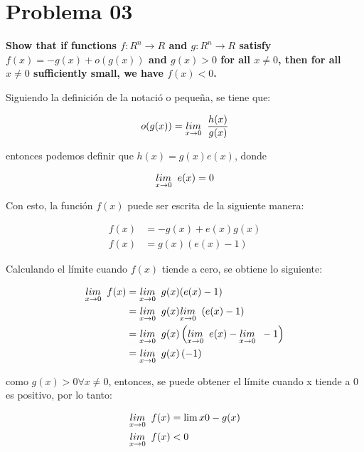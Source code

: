 \section*{Problema 03}

\textbf{Show that if functions $f : R^n \rightarrow R$ and $g : R^n \rightarrow R$ satisfy $f (x) = -g(x) + o(g(x))$ and $g(x) > 0$ for all $x \neq 0$, then for all $x \neq 0$ sufficiently small, we have $f (x) < 0$.}

Siguiendo la definición de la notació o pequeña, se tiene que:

\begin{equation*}
    o(g(x)) = \underset{x \rightarrow 0}{lim} \;\; \frac{h(x)}{g(x)}
\end{equation*}

entonces podemos definir que $h(x)=g(x)e(x)$, donde

\begin{equation*}
    \underset{x \rightarrow 0}{lim} \;\; e(x) =0
\end{equation*}

Con esto, la función $f(x)$ puede ser escrita de la siguiente manera:

\begin{align*}
    f(x) & = -g(x) + e(x)g(x) \\
    f(x) & =  g(x) (e(x)-1)
\end{align*}

Calculando el límite cuando $f(x)$ tiende a cero, se obtiene lo siguiente:

\begin{align*}
    \underset{x \rightarrow 0}{lim} \;\; f(x) & = \underset{x \rightarrow 0}{lim} \;\; g(x) (e(x)-1)                                          \\
                      & =\underset{x \rightarrow 0}{lim} \;\; g(x) \underset{x \rightarrow 0}{lim} \;\; (e(x)-1)                              \\
                      & =\underset{x \rightarrow 0}{lim} \;\; g(x) \left (\underset{x \rightarrow 0}{lim} \;\; e(x) - \underset{x \rightarrow 0}{lim} \;\; -1\right ) \\
                      & =\underset{x \rightarrow 0}{lim} \;\; g(x) \left (-1\right )
\end{align*}

como $g(x)>0 \forall x\neq 0$, entonces, se puede obtener el límite cuando x tiende a 0 es positivo, por lo tanto:

\begin{align*}
    \underset{x \rightarrow 0}{lim} \;\; f(x) & = \lim{x}{0} -g(x) \\
    \underset{x \rightarrow 0}{lim} \;\; f(x) & <0
\end{align*}